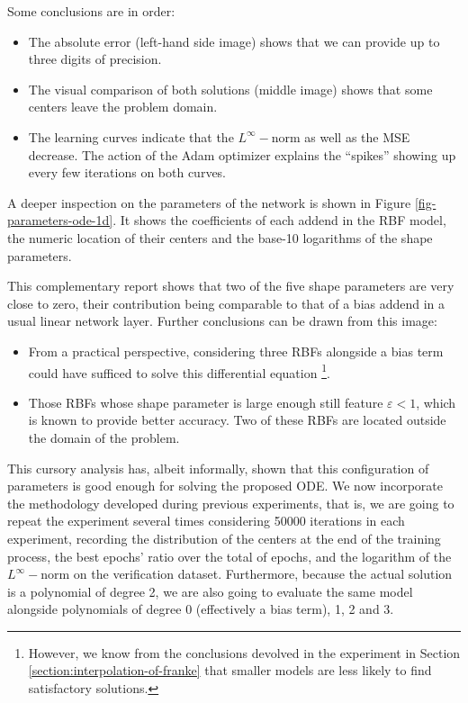 \documentclass[12pt]{report} %
\begin{document}
Some conclusions are in order:
\begin{itemize}
  \item The absolute error (left-hand side image) shows that we can provide up to three digits
        of precision.
  \item The visual comparison of both solutions (middle image) shows that
        some centers leave the problem domain.
  \item The learning curves indicate that the $L^\infty-$norm as well as the MSE decrease.
        The action of the Adam optimizer explains the ``spikes'' showing up every few iterations
        on both curves.
\end{itemize}

A deeper inspection on the parameters of the network is shown in Figure \ref{fig-parameters-ode-1d}.
It shows the coefficients of each addend in the RBF model, the numeric location of
their centers and the base-10 logarithms of the shape parameters.

This complementary report shows that two of the five shape parameters are very close to zero,
their contribution being comparable to that of a bias addend in a usual linear network layer.
Further conclusions can be drawn from this image:
\begin{itemize}
  \item From a practical perspective, considering three
        RBFs alongside a bias term could have sufficed to solve this differential equation
        \footnote{However, we know from the conclusions devolved in the experiment in Section
          \ref{section:interpolation-of-franke} that smaller models are less likely to find
          satisfactory solutions.}.
  \item Those RBFs whose shape parameter is large enough still feature $\varepsilon<1$, which is
        known to provide better accuracy. Two of these RBFs are located outside the
        domain of the problem.
\end{itemize}

This cursory analysis has, albeit informally, shown that this configuration of parameters
is good enough for solving the proposed ODE. We now incorporate the
methodology developed during previous experiments, that is, we are going to repeat the experiment
several times considering 50000 iterations in each experiment,
recording the distribution of the centers at the end of the training
process, the best epochs' ratio over the total of epochs, and the logarithm of the $L^\infty-$norm
on the verification dataset. Furthermore,
because the actual solution is a polynomial
of degree 2, we are also going to evaluate the same model alongside polynomials of degree 0
(effectively a bias term), 1, 2 and 3. 
\end{document}
